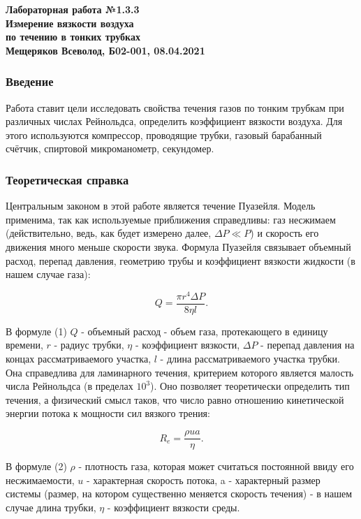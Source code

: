\documentclass[a4paper, fontsize = 14pt]{article}
\begin{document}
\begin{center} \textbf{
Лабораторная работа №1.3.3 \\ Измерение вязкости воздуха \\ по течению в тонких трубках \\
Мещеряков Всеволод, Б02-001, 08.04.2021}
\end{center}

\subsubsection*{Введение}

Работа ставит цели исследовать свойства течения газов по тонким трубкам при различных числах Рейнольдса, определить коэффициент вязкости воздуха. Для этого используются компрессор, проводящие трубки, газовый барабанный счётчик, спиртовой микроманометр, секундомер.

\subsubsection*{Теоретическая справка}

Центральным законом в этой работе является течение Пуазейля. Модель применима, так как используемые приближения справедливы: газ несжимаем (действительно, ведь, как будет измерено далее, $\Delta P \ll P$) и скорость его движения много меньше скорости звука. Формула Пуазейля связывает объемный расход, перепад давления, геометрию трубы и коэффициент вязкости жидкости (в нашем случае газа):

\begin{equation}
	Q = \frac{\pi r^4 \Delta P}{8 \eta l}.
\end{equation}   

В формуле (1) $Q$ - объемный расход - объем газа, протекающего в единицу времени, $r$ - радиус трубки, $\eta$ - коэффициент вязкости, $\Delta P$ - перепад давления на концах рассматриваемого участка, $l$ - длина рассматриваемого участка трубки. Она справедлива для ламинарного течения, критерием которого является малость числа Рейнольдса (в пределах $10^3$). Оно позволяет теоретически определить тип течения, а физический смысл таков, что число равно отношению кинетической энергии потока к мощности сил вязкого трения:

\begin{equation}
	R_e=\frac{\rho u a}{\eta}.
\end{equation}
	
В формуле (2) $\rho$ - плотность газа, которая может считаться постоянной ввиду его несжимаемости, $u$ - характерная скорость потока, a - характерный размер системы (размер, на котором существенно меняется скорость течения) - в нашем случае длина трубки, $\eta$ - коэффициент вязкости среды. 
\end{document}
